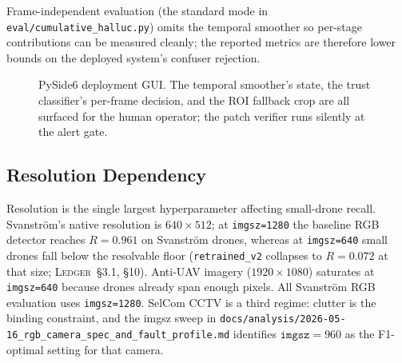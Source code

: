 Frame-independent evaluation (the standard mode in \texttt{eval/cumulative\_halluc.py}) omits the temporal smoother so per-stage contributions can be measured cleanly; the reported metrics are therefore lower bounds on the deployed system's confuser rejection.

\begin{figure}[htbp]
    \centering
    \caption{PySide6 deployment GUI. The temporal smoother's state, the trust classifier's per-frame decision, and the ROI fallback crop are all surfaced for the human operator; the patch verifier runs silently at the alert gate.}
    \label{fig:pyside_gui}
\end{figure}

\subsection{Resolution Dependency}
\label{sec:resolution_arch}

Resolution is the single largest hyperparameter affecting small-drone recall. Svanstr\"om's native resolution is $640\times 512$; at \texttt{imgsz=1280} the baseline RGB detector reaches $R=0.961$ on Svanstr\"om drones, whereas at \texttt{imgsz=640} small drones fall below the resolvable floor (\texttt{retrained\_v2} collapses to $R=0.072$ at that size; \textsc{Ledger}~\S3.1, \S10). Anti-UAV imagery ($1920\times 1080$) saturates at \texttt{imgsz=640} because drones already span enough pixels. All Svanstr\"om RGB evaluation uses \texttt{imgsz=1280}. SelCom CCTV is a third regime: clutter is the binding constraint, and the imgsz sweep in \texttt{docs/analysis/2026-05-16\_rgb\_camera\_spec\_and\_fault\_profile.md} identifies $\mathtt{imgsz}=960$ as the F1-optimal setting for that camera.

